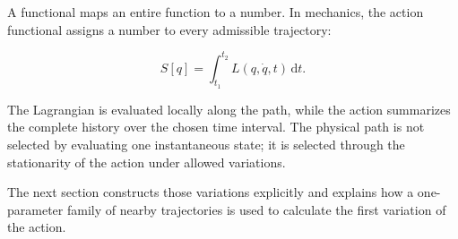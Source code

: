 A functional maps an entire function to a number. In mechanics, the action functional assigns a number to every admissible trajectory:

\[
S[q]
=
\int_{t_{1}}^{t_{2}}
L(q,\dot q,t)
\,\mathrm{d}t.
\]

The Lagrangian is evaluated locally along the path, while the action summarizes the complete history over the chosen time interval. The physical path is not selected by evaluating one instantaneous state; it is selected through the stationarity of the action under allowed variations.

The next section constructs those variations explicitly and explains how a one-parameter family of nearby trajectories is used to calculate the first variation of the action.